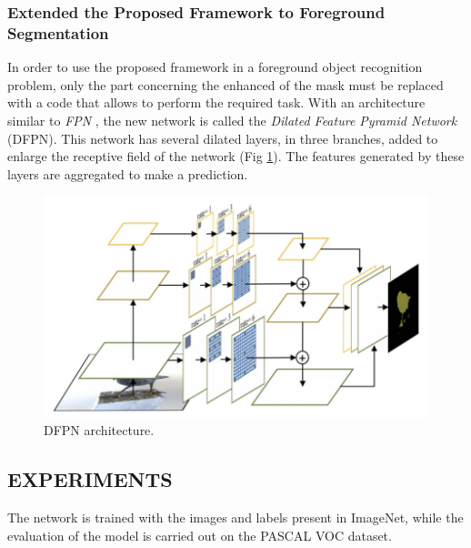 \subsubsection{Extended the Proposed Framework to Foreground Segmentation}
In order to use the proposed framework in a foreground object recognition 
problem, only the part concerning the enhanced of the mask must be replaced 
with a code that allows to perform the required task. With an architecture 
similar to \emph{FPN} \cite{0876055543}, the new network is called the \emph{Dilated Feature Pyramid 
Network} (DFPN). This network has several dilated layers, in three branches, 
added to enlarge the receptive field of the network (Fig \ref{fig:DFPN}). The features generated 
by these layers are aggregated to make a prediction.
\begin{figure}[h!]
    \centering
    \includegraphics[width = 0.8 \linewidth]{images/paper6/DFPN.png}
    \centering
    \caption{DFPN architecture.}
    \label{fig:DFPN}
\end{figure}

\subsection{EXPERIMENTS}
The network is trained with the images and labels present in ImageNet, while 
the evaluation of the model is carried out on the PASCAL VOC dataset.
